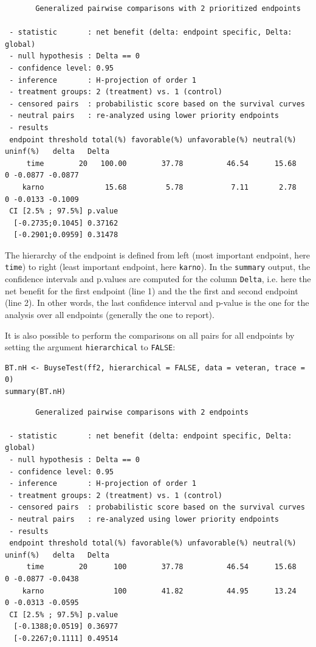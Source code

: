 \documentclass[12pt]{article}
\begin{document}
\begin{verbatim}
       Generalized pairwise comparisons with 2 prioritized endpoints

 - statistic       : net benefit (delta: endpoint specific, Delta: global) 
 - null hypothesis : Delta == 0 
 - confidence level: 0.95 
 - inference       : H-projection of order 1
 - treatment groups: 2 (treatment) vs. 1 (control) 
 - censored pairs  : probabilistic score based on the survival curves
 - neutral pairs   : re-analyzed using lower priority endpoints
 - results
 endpoint threshold total(%) favorable(%) unfavorable(%) neutral(%) uninf(%)   delta   Delta
     time        20   100.00        37.78          46.54      15.68        0 -0.0877 -0.0877
    karno              15.68         5.78           7.11       2.78        0 -0.0133 -0.1009
 CI [2.5% ; 97.5%] p.value 
  [-0.2735;0.1045] 0.37162 
  [-0.2901;0.0959] 0.31478
\end{verbatim}

The hierarchy of the endpoint is defined from left (most important
endpoint, here \texttt{time}) to right (least important endpoint, here
\texttt{karno}). In the \texttt{summary} output, the confidence intervals and
p.values are computed for the column \texttt{Delta}, i.e. here the net
benefit for the first endpoint (line 1) and the the first and second
endpoint (line 2). In other words, the last confidence interval and
p-value is the one for the analysis over all endpoints (generally the
one to report).

\bigskip

It is also possible to perform the comparisons on all pairs for all
endpoints by setting the argument \texttt{hierarchical} to \texttt{FALSE}:
\lstset{language=r,label= ,caption= ,captionpos=b,numbers=none}
\begin{lstlisting}
BT.nH <- BuyseTest(ff2, hierarchical = FALSE, data = veteran, trace = 0)
summary(BT.nH)
\end{lstlisting}

\begin{verbatim}
       Generalized pairwise comparisons with 2 endpoints

 - statistic       : net benefit (delta: endpoint specific, Delta: global) 
 - null hypothesis : Delta == 0 
 - confidence level: 0.95 
 - inference       : H-projection of order 1
 - treatment groups: 2 (treatment) vs. 1 (control) 
 - censored pairs  : probabilistic score based on the survival curves
 - neutral pairs   : re-analyzed using lower priority endpoints
 - results
 endpoint threshold total(%) favorable(%) unfavorable(%) neutral(%) uninf(%)   delta   Delta
     time        20      100        37.78          46.54      15.68        0 -0.0877 -0.0438
    karno                100        41.82          44.95      13.24        0 -0.0313 -0.0595
 CI [2.5% ; 97.5%] p.value 
  [-0.1388;0.0519] 0.36977 
  [-0.2267;0.1111] 0.49514
\end{verbatim}
\end{document}

